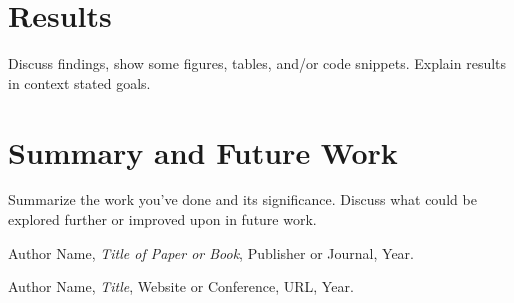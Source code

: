 \documentclass[12pt]{article}
\begin{document}
\section{Results}
Discuss findings, show some figures, tables, and/or code snippets.
Explain results in context stated goals.


\section{Summary and Future Work}
Summarize the work you've done and its significance. Discuss what could be explored further or improved upon in future work.

\newpage
\begin{thebibliography}{9}
    Author Name, \textit{Title of Paper or Book}, Publisher or Journal, Year.

    Author Name, \textit{Title}, Website or Conference, URL, Year.
\end{thebibliography}
\end{document}

